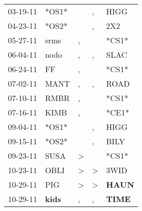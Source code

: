 \begin{supertabular}{p{0.07\textwidth}p{0.06\textwidth}p{0.02\textwidth}p{0.02\textwidth}p{0.06\textwidth}}
          03-19-11\textsuperscript{} &                            *OS1* &                  &                , &           HIGG\textsuperscript{} \\
          04-23-11\textsuperscript{} &                            *OS2* &                  &                , &            2X2\textsuperscript{} \\
          05-27-11\textsuperscript{} &           srms\textsuperscript{} &                , &                  &                            *CS1* \\
          06-04-11\textsuperscript{} &           nodo\textsuperscript{} &                , &                , &           SLAC\textsuperscript{} \\
          06-24-11\textsuperscript{} &             FF\textsuperscript{} &                , &                  &                            *CS1* \\
          07-02-11\textsuperscript{} &           MANT\textsuperscript{} &                , &                , &           ROAD\textsuperscript{} \\
          07-10-11\textsuperscript{} &           RMBR\textsuperscript{} &                , &                  &                            *CS1* \\
          07-16-11\textsuperscript{} &           KIMB\textsuperscript{} &                , &                  &                            *CE1* \\
          09-04-11\textsuperscript{} &                            *OS1* &                  &                , &           HIGG\textsuperscript{} \\
          09-15-11\textsuperscript{} &                            *OS2* &                  &                , &           BILY\textsuperscript{} \\
          09-23-11\textsuperscript{} &           SUSA\textsuperscript{} &     \textgreater &                  &                            *CS1* \\
          10-23-11\textsuperscript{} &           OBLI\textsuperscript{} &     \textgreater &     \textgreater &           3WID\textsuperscript{} \\
          10-29-11\textsuperscript{} &            PIG\textsuperscript{} &     \textgreater &     \textgreater &  \textbf{HAUN\textsuperscript{}} \\
          10-29-11\textsuperscript{} &  \textbf{kids\textsuperscript{}} &                , &                , &  \textbf{TIME\textsuperscript{}} \\

\end{supertabular}
